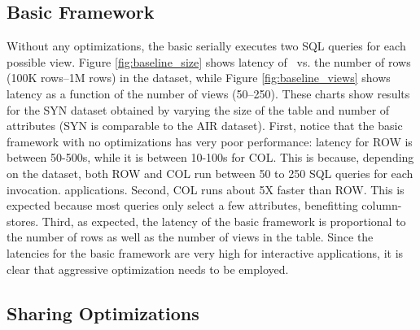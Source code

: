 \subsection{Basic {\large \SeeDB} Framework}
\label{sec:basic_framework_expts}

Without any optimizations, the basic \SeeDB
serially executes two SQL queries for each
possible view.
Figure \ref{fig:baseline_size} shows latency of \SeeDB\ vs. the number of rows (100K rows--1M rows) 
in the dataset, while Figure \ref{fig:baseline_views} shows latency as a function 
of the number of views (50--250).
These charts show results for the SYN dataset obtained by varying the size of the
table and number of attributes (SYN is comparable to the AIR dataset).
First, notice that the basic framework with no optimizations has very 
poor performance: latency for ROW is between 50-500s, 
while it is between 10-100s for COL. 
This is because, depending on the dataset, both ROW and COL run between 50 to 250 SQL queries 
for each \SeeDB invocation.
applications. 
Second, COL runs about 5X faster than ROW. 
This is expected because most queries only select a few attributes,
benefitting column-stores.
Third, as expected, the latency of the
basic framework is proportional to the number of rows as well as the 
number of views in the table.
Since the latencies for the basic framework are very high for interactive
applications, it is clear that aggressive optimization needs to be employed.

\subsection{Sharing Optimizations}
\label{sec:expts_dbms_execution_engine}

